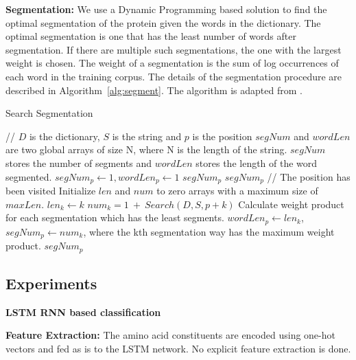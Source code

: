 \documentclass[runningheads]{llncs}
\begin{document}
\textbf{Segmentation:} We use a Dynamic Programming based solution to find the optimal segmentation of the protein given the words in the dictionary. The optimal segmentation is one that has the least number of words after segmentation. If there are multiple such segmentations, the one with the largest weight is chosen. The weight of a segmentation is the sum of log occurrences of each word in the training corpus. The details of the segmentation procedure are described in Algorithm~\ref{alg:segment}. The algorithm is adapted from \cite{yang2008classification}.

\begin{algorithm}[h!]
\caption{Search Segmentation}
\label{alg:segment}
\begin{algorithmic}[1]
 // $D$ is the dictionary, $S$ is the string and $p$ is the position 
\State $segNum$ and $wordLen$ are two global arrays of size N, where N is the length of the string. $segNum$ stores the number of segments and $wordLen$ stores the length of the word segmented.
        \State $segNum_p \gets 1, wordLen_p \gets 1$
        \State \Return $segNum_p$
    \EndIf
        \State \Return $segNum_p$ // The position has been visited 
    \EndIf
    \State Initialize $len$ and $num$ to zero arrays with a maximum size of $maxLen$.
            \State $len_k \gets k$
            \State $num_{k} = 1\ +\ Search(D, S, p+k)$
        \EndIf
    \EndFor
        \State Calculate weight product for each segmentation which has the least segments.
    \EndIf
    \State $wordLen_p \gets len_k$, $segNum_p \gets num_k$, where the kth segmentation way has the maximum weight product.
    \State \Return $segNum_p$
  
\EndProcedure
\end{algorithmic}
\end{algorithm}

\subsection{Experiments}

\textbf{LSTM RNN based classification}

\textbf{Feature Extraction:} The amino acid constituents are encoded using one-hot vectors and fed as is to the LSTM network. No explicit feature extraction is done.
\end{document}
